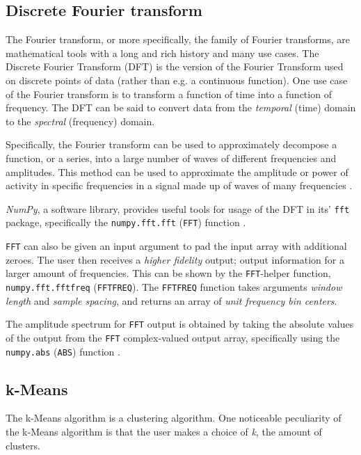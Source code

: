 \documentclass{article}
\begin{document}
\subsection{Discrete Fourier transform}\label{DFT BG}

The Fourier transform, or more specifically, the family of Fourier transforms, are mathematical tools with a long and rich history and many use cases. 
The Discrete Fourier Transform (DFT) is the version of the Fourier Transform used on discrete points of data (rather than e.g. a continuous function). 
One use case of the Fourier transform is to transform a function of time into a function of frequency. 
The DFT can be said to convert data from the \textit{temporal} (time) domain to the \textit{spectral} (frequency) domain.

Specifically, the Fourier transform can be used to approximately decompose a function, or a series, into a large number of waves of different frequencies and amplitudes. 
This method can be used to approximate the amplitude or power of activity in specific frequencies in a signal made up of waves of many frequencies \citep{Fourier}.

\textit{NumPy}, a software library, provides useful tools for usage of the DFT in its' \texttt{fft} package, specifically the \texttt{numpy.fft.fft} (\texttt{FFT}) function \citep{numpy}.

\texttt{FFT} can also be given an input argument to pad the input array with additional zeroes. 
The user then receives a \textit{higher fidelity} output; output information for a larger amount of frequencies.
This can be shown by the \texttt{FFT}-helper function, \texttt{numpy.fft.fftfreq} (\texttt{FFTFREQ}). 
The \texttt{FFTFREQ} function takes arguments \textit{window length} and \textit{sample spacing}, and returns an array of \textit{unit frequency bin centers}. 

The amplitude spectrum for \texttt{FFT} output is obtained by taking the absolute values of the output from the \texttt{FFT} complex-valued output array, specifically using the \texttt{numpy.abs} (\texttt{ABS}) function \citep{numpy}.

\subsection{k-Means}\label{KM BG}

The k-Means algorithm is a clustering algorithm. 
One noticeable peculiarity of the k-Means algorithm is that the user makes a choice of \textit{k}, the amount of clusters. 
\end{document}
